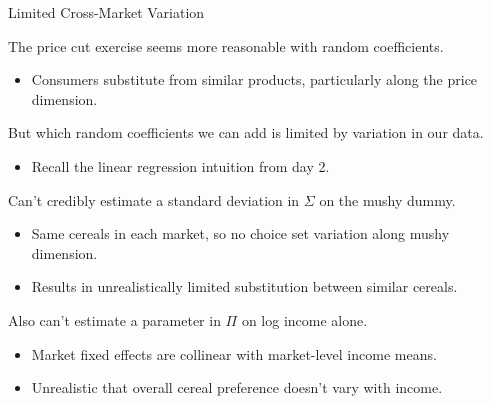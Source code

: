 \documentclass[aspectratio=169,t,11pt,table]{beamer}
\begin{document}
\begin{frame}{Limited Cross-Market Variation}
    \begin{wideitemize}
        \item The price cut exercise seems more reasonable with random coefficients.
        \begin{itemize}
            \item Consumers substitute from similar products, particularly along the price dimension.
        \end{itemize}
        \pause
        \item But which random coefficients we can add is limited by variation in our data.
        \begin{itemize}
            \item Recall the linear regression intuition from day 2.
        \end{itemize}
        \pause
        \item Can't credibly estimate a standard deviation in $\Sigma$ on the mushy dummy.
        \begin{itemize}
            \item Same cereals in each market, so no choice set variation along mushy dimension.
            \item Results in unrealistically limited substitution between similar cereals.
        \end{itemize}
        \pause
        \item Also can't estimate a parameter in $\Pi$ on log income alone.
        \begin{itemize}
            \item Market fixed effects are collinear with market-level income means.
            \item Unrealistic that overall cereal preference doesn't vary with income.
        \end{itemize}
    \end{wideitemize}
\end{frame}
\end{document}
